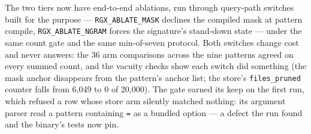 \documentclass[11pt,letterpaper]{article}
\begin{document}
The two tiers now have end-to-end ablations, run through query-path
switches built for the purpose --- \texttt{RGX\_ABLATE\_MASK} declines the
compiled mask at pattern compile, \texttt{RGX\_ABLATE\_NGRAM} forces the
signature's stand-down state --- under the same count gate and the same
min-of-seven protocol. Both switches change cost and never answers: the 36
arm comparisons across the nine patterns agreed on every summed count, and
the vacuity checks show each switch did something (the mask anchor
disappears from the pattern's anchor list; the store's
\texttt{files\_pruned} counter falls from 6{,}049 to 0 of 20{,}000). The
gate earned its keep on the first run, which refused a row whose store arm
silently matched nothing: its argument parser read a pattern containing
\texttt{=} as a bundled option --- a defect the run found and the
binary's tests now pin.
\end{document}

